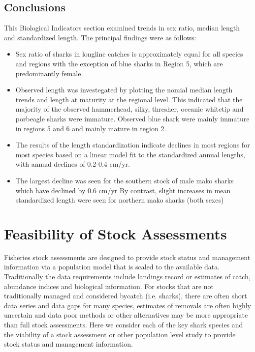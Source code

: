 \documentclass[12pt]{SCreport}
\begin{document}
            
\subsection{Conclusions}

This Biological Indicators section examined trends in sex ratio, median length and standardized length.  The principal findings were as follows:
\begin{itemize}
\item Sex ratio of sharks in longline catches is approximately equal for all species and regions with the exception of blue sharks in Region 5, which are predominantly female.
\item Observed length was investegated by plotting the nomial median length trends and length at
maturity at the regional level. This indicated that the majority of the observed hammerhead, silky,
thresher, oceanic whitetip and porbeagle sharks were immature. Observed blue shark were mainly
immature in regions 5 and 6 and mainly mature in region 2.
\item The results of the length standardization indicate declines in most regions for most species based
on a linear model fit to the standardized annual lengths, with annual declines of 0.2-0.4 cm/yr.
\item The largest decline was seen for the southern stock of male mako sharks which have declined by 0.6 cm/yr
By contrast, slight increases in mean standardized length were seen for northern mako sharks (both sexes)
\end{itemize}

      
 \clearpage     
      
\section{Feasibility of Stock Assessments}
Fisheries stock assessments are designed to provide stock status and management information via a population model that is scaled to the available data. Traditionally the data requirements include landings record or estimates of catch, abundance indices and biological information. For stocks that are not traditionally managed and considered bycatch (i.e. sharks), there are often short data series and data gaps for many species, estimates of removals are often highly uncertain and data poor methods or other alternatives may be more appropriate than full stock assessments. Here we consider each of the key shark species and the viability of a stock assessment or other population level study to provide stock status and management information.
\end{document}

